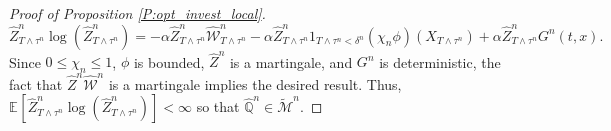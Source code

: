 \documentclass[11pt, letterpaper]{amsart}
\theoremstyle{definition}
\theoremstyle{remark}
\numberwithin{equation}{section}
\newcommand{\We}{\mathcal{W}}
\newcommand{\hwe}{\hat{\We}}
\newcommand{\hz}{\hat{Z}}
\newcommand{\hqprob}{\hat{\qprob}}
\newcommand{\qprob}{\mathbb{Q}}
\newcommand{\esp}{\mathbb{E}}
\newcommand{\espalt}[2]{\esp^{#1}\bra{#2}}
\newcommand{\F}{\mathcal{F}}
\newcommand{\tM}{\widetilde{\mathcal{M}}}
\newcommand{\EN}{\mathcal{E}}
\newcommand{\nada}[1]{}
\newcommand{\bra}[1]{\left[#1\right]}
\begin{document}
\begin{proof}[Proof of Proposition \ref{P:opt_invest_local}]
\begin{equation*}
\hz^n_{T\wedge\tau^n}\log\left(\hz^n_{T\wedge\tau^n}\right) = -\alpha \hz^n_{T\wedge\tau^n}\hwe^n_{T\wedge\tau^n} - \alpha \hz^n_{T\wedge\tau^n} 1_{T\wedge\tau^n<\delta^n}(\chi_n\phi)(X_{T\wedge\tau^n}) + \alpha \hz^n_{T\wedge\tau^n}G^n(t,x).
\end{equation*}
Since $0\leq\chi_n\leq 1$, $\phi$ is bounded, $\hz^n$ is a martingale, and $G^n$ is deterministic, the fact that $\hz^n\hwe^n$ is a martingale implies the desired result.  Thus, $\espalt{}{\hz^n_{T\wedge\tau^n}\log\left(\hz^n_{T\wedge\tau^n}\right)} < \infty$ so that $\hqprob^n\in\tM^n$.



\nada{

 Next, we can explicitly solve for $\hz^n$:
\begin{equation*}
\begin{split}
\hz^n_s &= 1_{\delta^n > s\wedge\tau^n} \EN\left(\int_t^\cdot (A^n_u)'dW_u + \int_t^\cdot B^n_u dW^0_u\right)_{s\wedge\tau^n} e^{-\int_t^{s\wedge\tau^n} C^n_u\chi_n\gamma(X_u) du}\\
&\quad + 1_{\delta^n\leq s\wedge\tau^n}\EN\left(\int_t^\cdot (A^n_u)'dW_u + \int_t^\cdot B^n_u dW^0_u\right)_{\delta^n} e^{-\int_t^{\delta^n} C^n_u\chi_n\gamma(X_u) du}(1+C^n_{\delta^n}).
\end{split}
\end{equation*}
By conditioning on $\F^{W,W^0}_{s\wedge\tau^n}$ and using \cite[Proposition 5.1.1 (ii)]{bielecki2004credit}\footnote{This is only proved for bounded random variables, but the result extends to positive random variables by the monotone convergence theorem.}:
\begin{equation*}
\begin{split}
\espalt{}{\hz^n_s} &= \espalt{}{\EN\left(\int_t^\cdot (A^n_u)'dW_u + \int_t^\cdot B^n_u dW^0_u\right)_{s\wedge\tau^n} e^{-\int_t^{s\wedge\tau^n}(\chi_n\gamma)(X_u)(1+ C^n_u) du}}\\
&\qquad + \espalt{}{\int_t^{s\wedge\tau^n} \EN\left(\int_t^\cdot (A^n_u)'dW_u + \int_t^\cdot B^n_u dW^0_u\right)_{u} (1+C^n_u)(\chi_n\gamma)(X_u)e^{-\int_t^u (1+C^n_u)(\chi_n\gamma)(X_v)dv}du};\\
&=\espalt{}{\int_t^{s\wedge\tau^n}e^{-\int_t^u (1+C^n_u)(\chi_n\gamma)(X_v)dv}\EN\left(\int_t^\cdot (A^n_u)'dW_u + \int_t^\cdot B^n_u dW^0_u\right)_{u}\left((A^n_u)'dW_u + B^n_u dW^0_u\right)}
\end{split}
\end{equation*}
}
\end{proof}
\end{document}
